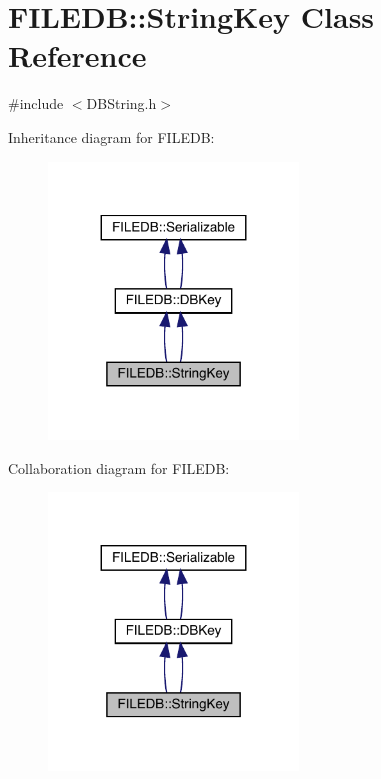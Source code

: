 \hypertarget{classFILEDB_1_1StringKey}{}\section{F\+I\+L\+E\+DB\+:\+:String\+Key Class Reference}
\label{classFILEDB_1_1StringKey}


{\ttfamily \#include $<$D\+B\+String.\+h$>$}



Inheritance diagram for F\+I\+L\+E\+DB\+:\nopagebreak
\begin{figure}[H]
\begin{center}
\leavevmode
\includegraphics[width=188pt]{df/dc2/classFILEDB_1_1StringKey__inherit__graph}
\end{center}
\end{figure}


Collaboration diagram for F\+I\+L\+E\+DB\+:\nopagebreak
\begin{figure}[H]
\begin{center}
\leavevmode
\includegraphics[width=188pt]{df/d4b/classFILEDB_1_1StringKey__coll__graph}
\end{center}
\end{figure}
